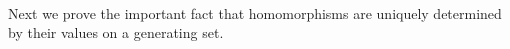 \begin{code}
\AgdaSymbol{(}\AgdaSpace{}%
\AgdaSpace{}%
\AgdaSpace{}%
\AgdaSpace{}%
\AgdaSymbol{)}\AgdaSpace{}%
\>[27]\AgdaSymbol{(}\AgdaSpace{}%
\AgdaSpace{}%
\AgdaSpace{}%
\AgdaSpace{}%
\AgdaSymbol{)}\AgdaSpace{}%
\<%
\\
%
\>[6]\AgdaSpace{}%
\AgdaSpace{}%
\AgdaSpace{}%
\AgdaSymbol{((}\AgdaSpace{}%
\AgdaSpace{}%
\AgdaSymbol{)}\AgdaSpace{}%
\AgdaSymbol{)}%
\>[27]\<%
\end{code}
\ccpad
Next we prove the important fact that homomorphisms are uniquely determined by their values on a generating set.
\ccpad

